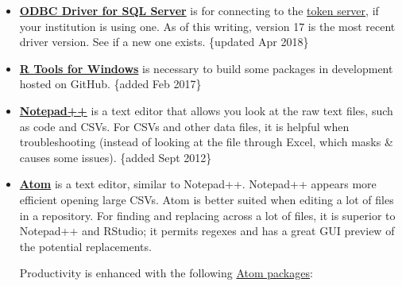 \documentclass[
]{book}
\begin{document}
\begin{itemize}
\item
  \textbf{\href{https://docs.microsoft.com/en-us/sql/connect/odbc/download-odbc-driver-for-sql-server}{ODBC Driver for SQL Server}} is for connecting to the \href{https://github.com/OuhscBbmc/REDCapR/blob/master/vignettes/SecurityDatabase.Rmd}{token server}, if your institution is using one. As of this writing, version 17 is the most recent driver version. See if a new one exists. \{updated Apr 2018\}
\item
  \textbf{\href{https://cran.r-project.org/bin/windows/Rtools/}{R Tools for Windows}} is necessary to build some packages in development hosted on GitHub. \{added Feb 2017\}
\item
  \textbf{\href{http://notepad-plus-plus.org/}{Notepad++}} is a text editor that allows you look at the raw text files, such as code and CSVs. For CSVs and other data files, it is helpful when troubleshooting (instead of looking at the file through Excel, which masks \& causes some issues). \{added Sept 2012\}
\item
  \textbf{\href{https://atom.io/}{Atom}} is a text editor, similar to Notepad++. Notepad++ appears more efficient opening large CSVs. Atom is better suited when editing a lot of files in a repository. For finding and replacing across a lot of files, it is superior to Notepad++ and RStudio; it permits regexes and has a great GUI preview of the potential replacements.

  Productivity is enhanced with the following \href{https://atom.io/packages}{Atom packages}:


\end{itemize}
\end{document}
